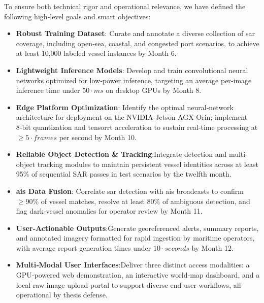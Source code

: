 \documentclass{article}
\begin{document}
	To ensure both technical rigor and operational relevance, we have defined the following high‑level goals and \acrshort{smart} objectives:
	\begin{itemize}
		\item \textbf{Robust Training Dataset}: Curate and annotate a diverse collection of \acrshort{sar} coverage, including open‑sea, coastal, and congested port scenarios, to achieve at least 10,000 labeled vessel instances by Month 6.
		\item \textbf{Lightweight Inference Models}: Develop and train convolutional neural networks optimized for low‑power inference, targeting an average per‑image inference time under $50\cdot ms$ on desktop GPUs by Month 8.
		\item \textbf{Edge Platform Optimization}: Identify the optimal neural‑network architecture for deployment on the NVIDIA Jetson AGX Orin; implement 8‑bit quantization and \acrshort{tensorrt} acceleration to sustain real‑time processing at $\geq 5\cdot frames$ per second by Month 10.
		\item \textbf{Reliable Object Detection \& Tracking}:Integrate detection and multi-object tracking modules to maintain persistent vessel identities across at least 95\% of sequential SAR passes in test scenarios by the twelfth month.
		\item \textbf{\acrshort{ais} Data Fusion}: Correlate \acrshort{sar} detection with \acrshort{ais} broadcasts to confirm $\geq90\%$ of vessel matches, resolve at least 80\% of ambiguous detection, and flag dark‑vessel anomalies for operator review by Month 11.
		\item \textbf{User‑Actionable Outputs}:Generate georeferenced alerts, summary reports, and annotated imagery formatted for rapid ingestion by maritime operators, with average report generation times under $10\cdot seconds$ by Month 12.
		\item \textbf{Multi‑Modal User Interfaces}:Deliver three distinct access modalities: a GPU‑powered web demonstration, an interactive world‑map dashboard, and a local raw‑image upload portal to support diverse end‑user workflows, all operational by thesis defense. \end{itemize}
	
	
\end{document}
